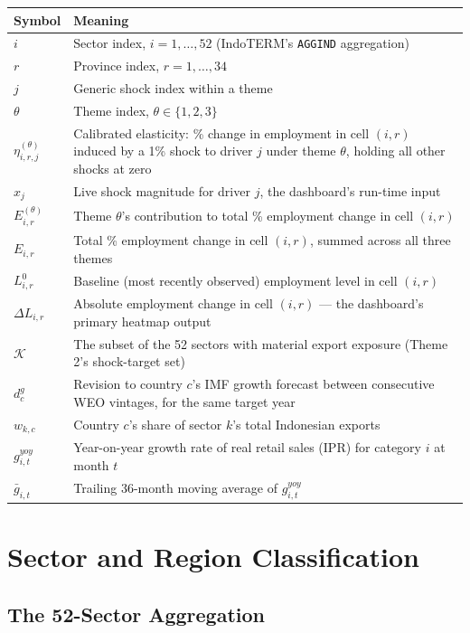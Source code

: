\documentclass[11pt]{article}
\begin{document}
\begin{longtable}{@{}p{3cm}p{11.5cm}@{}}
\toprule
Symbol & Meaning \\
\midrule
\endhead
$i$ & Sector index, $i = 1,\dots,52$ (IndoTERM's \texttt{AGGIND} aggregation) \\
$r$ & Province index, $r = 1,\dots,34$ \\
$j$ & Generic shock index within a theme \\
$\theta$ & Theme index, $\theta \in \{1,2,3\}$ \\
$\eta_{i,r,j}^{(\theta)}$ & Calibrated elasticity: \% change in employment in
  cell $(i,r)$ induced by a 1\% shock to driver $j$ under theme $\theta$,
  holding all other shocks at zero \\
$x_j$ & Live shock magnitude for driver $j$, the dashboard's run-time input \\
$E_{i,r}^{(\theta)}$ & Theme $\theta$'s contribution to total \% employment
  change in cell $(i,r)$ \\
$E_{i,r}$ & Total \% employment change in cell $(i,r)$, summed across all
  three themes \\
$L_{i,r}^{0}$ & Baseline (most recently observed) employment level in cell
  $(i,r)$ \\
$\Delta L_{i,r}$ & Absolute employment change in cell $(i,r)$ --- the
  dashboard's primary heatmap output \\
$\mathcal{K}$ & The subset of the 52 sectors with material export exposure
  (Theme 2's shock-target set) \\
$d^g_c$ & Revision to country $c$'s IMF growth forecast between consecutive
  WEO vintages, for the same target year \\
$w_{k,c}$ & Country $c$'s share of sector $k$'s total Indonesian exports \\
$g_{i,t}^{yoy}$ & Year-on-year growth rate of real retail sales (IPR) for
  category $i$ at month $t$ \\
$\bar g_{i,t}$ & Trailing 36-month moving average of $g_{i,t}^{yoy}$ \\
\bottomrule
\end{longtable}

\section{Sector and Region Classification}
\label{sec:classification}

\subsection{The 52-Sector Aggregation}
\end{document}
